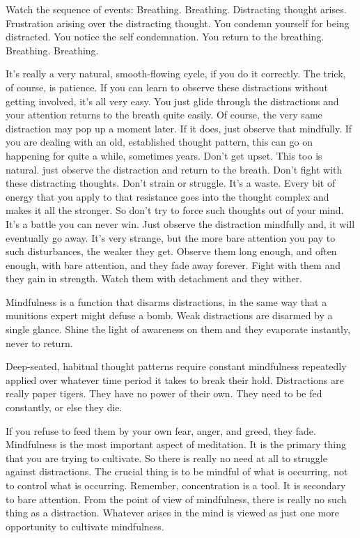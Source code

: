 Watch the sequence of events: Breathing. Breathing. Distracting thought arises.
Frustration arising over the distracting thought.
You condemn yourself for being distracted. You notice the self condemnation. You return to the breathing. Breathing. Breathing.

It's really a very natural, smooth-flowing cycle, if you do it correctly. The
trick, of course, is patience. If you can learn to observe these distractions
without getting involved, it's all very easy. You just glide through the
distractions and your attention returns to the breath quite easily. Of course,
the very same distraction may pop up a moment later. If it does, just observe
that mindfully. If you are dealing with an old, established thought pattern,
this can go on happening for quite a while, sometimes years. Don't get upset.
This too is natural. just observe the distraction and return to the breath.
Don't fight with these distracting thoughts. Don't strain or struggle. It's a
waste. Every bit of energy that you apply to that resistance goes into the
thought complex and makes it all the stronger. So don't try to force such
thoughts out of your mind. It's a battle you can never win. Just observe the
distraction mindfully and, it will eventually go away. It's very strange, but
the more bare attention you pay to such disturbances, the weaker they get.
Observe them long enough, and often enough, with bare attention, and they fade
away forever. Fight with them and they gain in strength. Watch them with
detachment and they wither.

Mindfulness is a function that disarms distractions, in the same way that a
munitions expert might defuse a bomb. Weak distractions are disarmed by a single
glance. Shine the light of awareness on them and they evaporate instantly, never
to return.

Deep-seated, habitual thought patterns require constant mindfulness repeatedly
applied over whatever time period it takes to break their hold. Distractions are
really paper tigers. They have no power of their own. They need to be fed
constantly, or else they die.

If you refuse to feed them by your own fear, anger, and greed, they fade.
Mindfulness is the most important aspect of meditation. It is the primary thing that you are trying to cultivate. So there is really
no need at all to struggle against distractions. The crucial thing is to be mindful of what is occurring, not to control what is
occurring. Remember, concentration is a tool. It is secondary to bare attention. From the point of view of mindfulness, there is
really no such thing as a distraction. Whatever arises in the mind is viewed as just one more opportunity to cultivate mindfulness.


